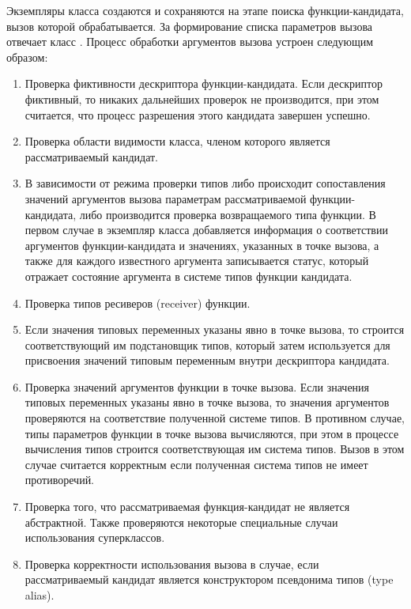 Экземпляры класса  создаются и сохраняются на этапе поиска функции-кандидата, вызов которой обрабатывается. За формирование списка параметров вызова отвечает класс . Процесс обработки аргументов вызова устроен следующим образом:
\begin{enumerate}
    \item Проверка фиктивности дескриптора функции-кандидата. Если дескриптор фиктивный, то никаких дальнейших проверок не производится, при этом считается, что процесс разрешения этого кандидата завершен успешно.  
    \item Проверка области видимости класса, членом которого является рассматриваемый кандидат. 
    \item В зависимости от режима проверки типов либо происходит сопоставления значений аргументов вызова параметрам рассматриваемой функции-кандидата, либо производится проверка возвращаемого типа функции. В первом случае в экземпляр класса  добавляется информация о соответствии аргументов функции-кандидата и значениях, указанных в точке вызова, а также для каждого известного аргумента записывается статус, который отражает состояние аргумента в системе типов функции кандидата.  
    \item Проверка типов ресиверов (receiver) функции.
    \item Если значения типовых переменных указаны явно в точке вызова, то строится соответствующий им подстановщик типов, который затем используется для присвоения значений типовым переменным внутри дескриптора кандидата.
    \item Проверка значений аргументов функции в точке вызова. Если значения типовых переменных указаны явно в точке вызова, то значения аргументов проверяются на соответствие полученной системе типов. В противном случае, типы параметров функции в точке вызова вычисляются, при этом в процессе вычисления типов строится соответствующая им система типов. Вызов в этом случае считается корректным если полученная система типов не имеет противоречий.      
    \item Проверка того, что рассматриваемая функция-кандидат не является абстрактной. Также проверяются некоторые специальные случаи использования суперклассов.
    \item Проверка корректности использования вызова в случае, если рассматриваемый кандидат является конструктором псевдонима типов (type alias). 
\end{enumerate}

